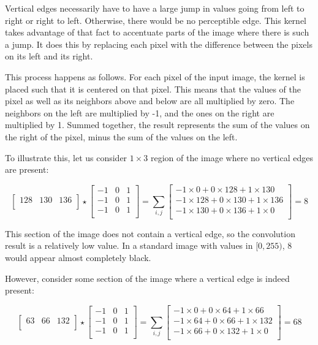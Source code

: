 Vertical edges necessarily have to have a large jump in values going from left to right or right to left. Otherwise, there would be no perceptible edge. This kernel takes advantage of that fact to accentuate parts of the image where there is such a jump. It does this by replacing each pixel with the difference between the pixels on its left and its right.

This process happens as follows. For each pixel of the input image, the kernel is placed such that it is centered on that pixel. This means that the values of the pixel as well as its neighbors above and below are all multiplied by zero. The neighbors on the left are multiplied by -1, and the ones on the right are multiplied by 1. Summed together, the result represents the sum of the values on the right of the pixel, minus the sum of the values on the left.

To illustrate this, let us consider $1 \times 3$ region of the image where no vertical edges are present:

\[
\begin{bmatrix}
128 & 130 & 136\\
\end{bmatrix}
\star
\begin{bmatrix}
-1 & 0 & 1\\
-1 & 0 & 1\\
-1 & 0 & 1\\
\end{bmatrix}
=
\sum_{i,j}
\begin{bmatrix}
-1 \times 0 + 0 \times 128 + 1 \times 130\\ 
-1 \times 128 + 0 \times 130 + 1 \times 136\\
-1 \times 130 + 0 \times 136 + 1 \times 0\\
\end{bmatrix}
= 8
\]

This section of the image does not contain a vertical edge, so the convolution result is a relatively low value. In a standard image with values in $[0, 255)$, 8 would appear almost completely black.

However, consider some section of the image where a vertical edge is indeed present:

\[
\begin{bmatrix}
63 & 66 & 132\\
\end{bmatrix}
\star
\begin{bmatrix}
-1 & 0 & 1\\
-1 & 0 & 1\\
-1 & 0 & 1\\
\end{bmatrix}
=
\sum_{i,j}
\begin{bmatrix}
-1 \times 0 + 0 \times 64 + 1 \times 66\\ 
-1 \times 64 + 0 \times 66 + 1 \times 132\\
-1 \times 66 + 0 \times 132 + 1 \times 0\\
\end{bmatrix}
= 68
\]

